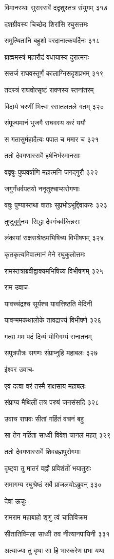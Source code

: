 विमानस्थाः सुरास्सर्वे ददृशुस्तत्र संयुगम् ३१७

दशग्रीवस्य चिच्छेद शिरांसि रघुसत्तमः

समुत्थितानि बहुशो वरदानात्कपर्दिनः ३१८

ब्राह्ममस्त्रं महारौद्रं वधायास्य दुरात्मनः

ससर्ज राघवस्तूर्णं कालाग्निसदृशप्रभम् ३१९

तदस्त्रं राघवोत्सृष्टं रावणस्य स्तनांतरम्

विदार्य धरणीं भित्त्वा रसातलतले गतम् ३२०

संपूज्यमानं भुजगै राघवस्य करं ययौ

स गतासुर्महादैत्यः पपात च ममार च ३२१

ततो देवगणास्सर्वे हर्षनिर्भरमानसाः

ववृषुः पुष्पवर्षाणि महात्मनि जगद्गुरौ ३२२

जगुर्गंधर्वपतयो ननृतुश्चाप्सरोगणाः

ववुः पुण्यास्तथा वाताः सुप्रभोऽभूद्दिवाकरः ३२३

तुष्टुवुर्मुनयः सिद्धा देवगंधर्वकिन्नराः

लंकायां राक्षसश्रेष्ठमभिषिच्य विभीषणम् ३२४

कृतकृत्यमिवात्मानं मेने रघुकुलोत्तमः

रामस्तत्राब्रवीद्वाक्यमभिषिच्य विभीषणम् ३२५

राम उवाच-

यावच्चंद्रश्च सूर्यश्च यावत्तिष्ठति मेदिनी

यावन्ममकथालोके तावद्राज्यं विभीषणे ३२६

गत्वा मम पदं दिव्यं योगिगम्यं सनातनम्

सपुत्रपौत्रः सगणः संप्राप्नुहि महाबलः ३२७

ईश्वर उवाच-

एवं दत्वा वरं तस्मै राक्षसाय महाबलः

संप्राप्य मैथिलीं तत्र परुषं जनसंसदि ३२८

उवाच राघवः सीतां गर्हितं वचनं बहु

सा तेन गर्हिता साध्वी विवेश चानलं महत् ३२९

ततो देवगणास्सर्वे शिवब्रह्मपुरोगमाः

दृष्ट्वा तु मातरं वह्नौ प्रविशंतीं भयातुराः

समागम्य रघुश्रेष्ठं सर्वे प्रांजलयोऽब्रुवन् ३३०

देवा ऊचुः-

रामराम महाबाहो शृणु त्वं चातिविक्रम

सीतातिविमला साध्वी तव नीत्यानपायिनी ३३१

अत्याज्या तु वृथा सा हि भास्करेण प्रभा यथा

